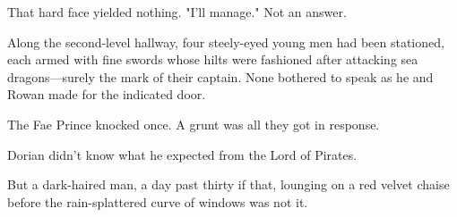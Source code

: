 That hard face yielded nothing.
"I'll manage."
Not an answer.

Along the second-level hallway, four steely-eyed young men had been stationed, each armed with fine swords whose hilts were fashioned after attacking sea dragons---surely the mark of their captain.
None bothered to speak as he and Rowan made for the indicated door.

The Fae Prince knocked once.
A grunt was all they got in response.

Dorian didn't know what he expected from the Lord of Pirates.

But a dark-haired man, a day past thirty if that, lounging on a red velvet chaise before the rain-splattered curve of windows was not it.
